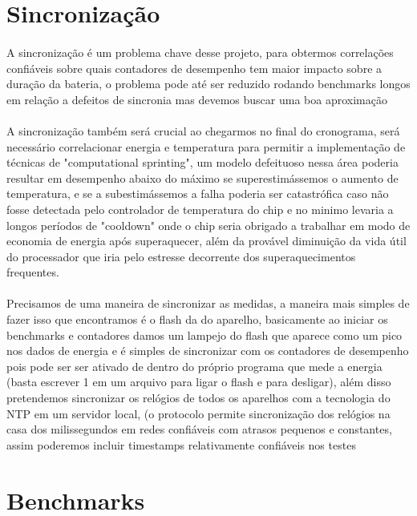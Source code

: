 \documentclass[11pt,a4paper,titlepage]{article}
\begin{document}
\section{Sincronização}
\paragraph{} A sincronização é um problema chave desse projeto, para obtermos correlações confiáveis sobre quais contadores de desempenho tem maior impacto sobre a duração da bateria, o problema pode até ser reduzido rodando benchmarks longos em relação a defeitos de sincronia mas devemos buscar uma boa aproximação
\paragraph{} A sincronização também será crucial ao chegarmos no final do cronograma, será necessário correlacionar energia e temperatura para permitir a implementação de técnicas de "computational sprinting", um modelo defeituoso nessa área poderia resultar em desempenho abaixo do máximo se superestimássemos o aumento de temperatura, e se a subestimássemos a falha poderia ser catastrófica caso não fosse detectada pelo controlador de temperatura do chip e no minimo levaria a longos períodos de "cooldown" onde o chip seria obrigado a trabalhar em modo de economia de energia após  superaquecer, além da provável diminuição da vida útil do processador que iria pelo estresse decorrente dos superaquecimentos frequentes.
\paragraph{} Precisamos de uma maneira de sincronizar as medidas, a maneira mais simples de fazer isso que encontramos é o flash da  do aparelho, basicamente ao iniciar os benchmarks e contadores damos um lampejo do flash que aparece como um pico nos dados de energia e é simples de sincronizar com os contadores de desempenho pois pode ser ser ativado de dentro do próprio programa que mede a energia (basta escrever 1 em um arquivo para ligar o flash e para desligar), além disso pretendemos sincronizar os relógios de todos os aparelhos com a tecnologia do NTP em um servidor local, (o protocolo permite sincronização dos relógios na casa dos milissegundos em redes confiáveis com atrasos pequenos e constantes, assim poderemos incluir timestamps relativamente confiáveis nos testes

\section{Benchmarks} 
\end{document}
